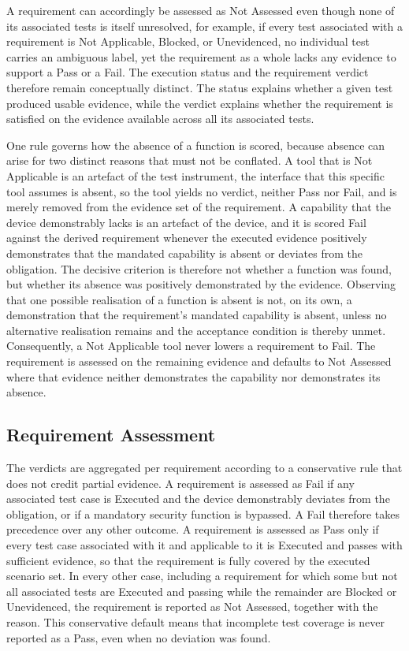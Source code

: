 A requirement can accordingly be assessed as Not Assessed even though none of its associated tests is itself unresolved, for example, if every test associated with a requirement is Not Applicable, Blocked, or Unevidenced, no individual test carries an ambiguous label, yet the requirement as a whole lacks any evidence to support a Pass or a Fail. The execution status and the requirement verdict therefore remain conceptually distinct. The status explains whether a given test produced usable evidence, while the verdict explains whether the requirement is satisfied on the evidence available across all its associated tests. 

One rule governs how the absence of a function is scored, because absence can arise for two distinct reasons that must not be conflated. A tool that is Not Applicable is an artefact of the test instrument, the interface that this specific tool assumes is absent, so the tool yields no verdict, neither Pass nor Fail, and is merely removed from the evidence set of the requirement. A capability that the device demonstrably lacks is an artefact of the device, and it is scored Fail against the derived requirement whenever the executed evidence positively demonstrates that the mandated capability is absent or deviates from the obligation. The decisive criterion is therefore not whether a function was found, but whether its absence was positively demonstrated by the evidence. Observing that one possible realisation of a function is absent is not, on its own, a demonstration that the requirement's mandated capability is absent, unless no alternative realisation remains and the acceptance condition is thereby unmet. Consequently, a Not Applicable tool never lowers a requirement to Fail. The requirement is assessed on the remaining evidence and defaults to Not Assessed where that evidence neither demonstrates the capability nor demonstrates its absence. 


\subsection{Requirement Assessment} 
\label{subsec:requirement_assessment} 

The verdicts are aggregated per requirement according to a conservative rule that does not credit partial evidence. A requirement is assessed as Fail if any associated test case is Executed and the device demonstrably deviates from the obligation, or if a mandatory security function is bypassed. A Fail therefore takes precedence over any other outcome. A requirement is assessed as Pass only if every test case associated with it and applicable to it is Executed and passes with sufficient evidence, so that the requirement is fully covered by the executed scenario set. In every other case, including a requirement for which some but not all associated tests are Executed and passing while the remainder are Blocked or Unevidenced, the requirement is reported as Not Assessed, together with the reason. This conservative default means that incomplete test coverage is never reported as a Pass, even when no deviation was found. 

